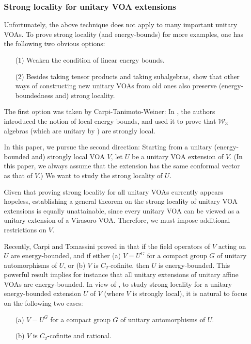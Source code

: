 \documentclass[11pt,b5paper,notitlepage]{article}
\theoremstyle{definition}
\theoremstyle{plain}
\newcommand{\mc}{\mathcal}
\numberwithin{equation}{section}
\begin{document}
\subsubsection{Strong locality for unitary VOA extensions}

Unfortunately, the above technique does not apply to many important unitary VOAs. To prove strong locality (and energy-bounds) for more examples, one has the following two obvious options:
\begin{enumerate}
\item[(1)] Weaken the condition of linear energy bounds.
\item[(2)] Besides taking tensor products and taking subalgebras, show that other ways of constructing new unitary VOAs from old ones also preserve (energy-boundedness and) strong locality. 
\end{enumerate} 
The first option was taken by Carpi-Tanimoto-Weiner: In \cite{CTW22}, the authors introduced the notion of local energy bounds, and used it to prove that $\mc W_3$ algebras (which are unitary by \cite{CTW23}) are strongly local.

In this paper, we pursue the second direction: Starting from a unitary (energy-bounded and) strongly local VOA $V$, let $U$ be a unitary VOA extension of $V$. (In this paper, we always assume that the extension has the same conformal vector as that of $V$.) We want to study the strong locality of $U$. 



Given that proving strong locality for all unitary VOAs currently appears hopeless, establishing a general theorem on the strong locality of unitary VOA extensions is equally unattainable, since every unitary VOA can be viewed as a unitary extension of a Virasoro VOA. Therefore, we must impose additional restrictions on $V$.


Recently, Carpi and Tomassini proved in \cite{CT23} that if the field operators of $V$ acting on $U$ are energy-bounded, and if either (a) $V=U^G$ for a compact group $G$ of unitary automorphisms of $U$, or (b) $V$ is $C_2$-cofinite, then $U$ is energy-bounded. This powerful result implies for instance that all unitary extensions of unitary affine VOAs are energy-bounded. In view of \cite{CT23}, to study strong locality for a unitary energy-bounded extension $U$ of $V$ (where $V$ is strongly local), it is natural to focus on the following two cases:
\begin{enumerate}
\item[(a)] $V=U^G$ for a compact group $G$ of unitary automorphisms of $U$.
\item[(b)] $V$ is $C_2$-cofinite and rational.
\end{enumerate}
\end{document}
